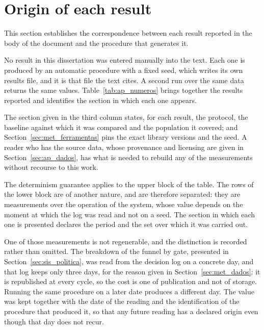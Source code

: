 \section{Origin of each result}
\label{sec:ap_numeros}

This section establishes the correspondence between each result reported in the body of the
document and the procedure that generates it.

No result in this dissertation was entered manually into the text. Each one is produced by an
automatic procedure with a fixed seed, which writes its own results file, and it is that file the
text cites. A second run over the same data returns the same values. Table~\ref{tab:ap_numeros}
brings together the results reported and identifies the section in which each one appears.

The section given in the third column states, for each result, the protocol, the baseline against which it was compared and the population it covered; and
Section~\ref{sec:met_ferramentas} pins the exact library versions and the seed. A reader who has
the source data, whose provenance and licensing are given in Section~\ref{sec:ap_dados}, has what
is needed to rebuild any of the measurements without recourse to this work.

The determinism guarantee applies to the upper block of the table. The rows of the lower block are
of another nature, and are therefore separated: they are measurements over the operation of the
system, whose value depends on the moment at which the log was read and not on a seed. The section
in which each one is presented declares the period and the set over which it was carried out.

One of those measurements is not regenerable, and the distinction is recorded rather than omitted.
The breakdown of the funnel by gate, presented in Section~\ref{sec:sis_politica}, was read from the
decision log on a concrete day, and that log keeps only three days, for the reason given in
Section~\ref{sec:met_dados}: it is republished at every cycle, so the cost is one of publication and
not of storage. Running the same procedure on a later date produces a different day. The value was kept together with the date of the reading and the identification of the
procedure that produced it, so that any future reading has a declared origin even though that day
does not recur.

